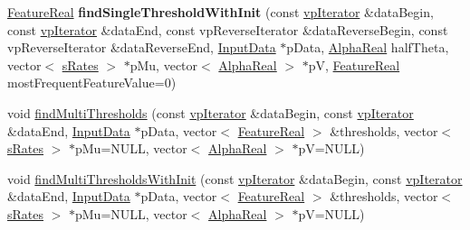 \begin{DoxyCompactItemize}
\hypertarget{classMultiBoost_1_1StumpAlgorithm_ad5da4a93172868d85c28dae3004019a2}{\hyperlink{Defaults_8h_a3a11cfe6a5d469d921716ca6291e934f}{Feature\-Real} {\bfseries find\-Single\-Threshold\-With\-Init} (const \hyperlink{classMultiBoost_1_1StumpAlgorithm_a358eae7c8636c09b6b26ef0cc74bbd51}{vp\-Iterator} \&data\-Begin, const \hyperlink{classMultiBoost_1_1StumpAlgorithm_a358eae7c8636c09b6b26ef0cc74bbd51}{vp\-Iterator} \&data\-End, const vp\-Reverse\-Iterator \&data\-Reverse\-Begin, const vp\-Reverse\-Iterator \&data\-Reverse\-End, \hyperlink{classMultiBoost_1_1InputData}{Input\-Data} $\ast$p\-Data, \hyperlink{Defaults_8h_a80184c4fd10ab70a1a17c5f97dcd1563}{Alpha\-Real} half\-Theta, vector$<$ \hyperlink{structMultiBoost_1_1sRates}{s\-Rates} $>$ $\ast$p\-Mu, vector$<$ \hyperlink{Defaults_8h_a80184c4fd10ab70a1a17c5f97dcd1563}{Alpha\-Real} $>$ $\ast$p\-V, \hyperlink{Defaults_8h_a3a11cfe6a5d469d921716ca6291e934f}{Feature\-Real} most\-Frequent\-Feature\-Value=0)}\label{classMultiBoost_1_1StumpAlgorithm_ad5da4a93172868d85c28dae3004019a2}

\item 
void \hyperlink{classMultiBoost_1_1StumpAlgorithm_ab50c25e9822b7b09ad5c01028ae624b9}{find\-Multi\-Thresholds} (const \hyperlink{classMultiBoost_1_1StumpAlgorithm_a358eae7c8636c09b6b26ef0cc74bbd51}{vp\-Iterator} \&data\-Begin, const \hyperlink{classMultiBoost_1_1StumpAlgorithm_a358eae7c8636c09b6b26ef0cc74bbd51}{vp\-Iterator} \&data\-End, \hyperlink{classMultiBoost_1_1InputData}{Input\-Data} $\ast$p\-Data, vector$<$ \hyperlink{Defaults_8h_a3a11cfe6a5d469d921716ca6291e934f}{Feature\-Real} $>$ \&thresholds, vector$<$ \hyperlink{structMultiBoost_1_1sRates}{s\-Rates} $>$ $\ast$p\-Mu=N\-U\-L\-L, vector$<$ \hyperlink{Defaults_8h_a80184c4fd10ab70a1a17c5f97dcd1563}{Alpha\-Real} $>$ $\ast$p\-V=N\-U\-L\-L)
\item 
void \hyperlink{classMultiBoost_1_1StumpAlgorithm_ad967b2d0083e2ca6c793c7d8557f2f49}{find\-Multi\-Thresholds\-With\-Init} (const \hyperlink{classMultiBoost_1_1StumpAlgorithm_a358eae7c8636c09b6b26ef0cc74bbd51}{vp\-Iterator} \&data\-Begin, const \hyperlink{classMultiBoost_1_1StumpAlgorithm_a358eae7c8636c09b6b26ef0cc74bbd51}{vp\-Iterator} \&data\-End, \hyperlink{classMultiBoost_1_1InputData}{Input\-Data} $\ast$p\-Data, vector$<$ \hyperlink{Defaults_8h_a3a11cfe6a5d469d921716ca6291e934f}{Feature\-Real} $>$ \&thresholds, vector$<$ \hyperlink{structMultiBoost_1_1sRates}{s\-Rates} $>$ $\ast$p\-Mu=N\-U\-L\-L, vector$<$ \hyperlink{Defaults_8h_a80184c4fd10ab70a1a17c5f97dcd1563}{Alpha\-Real} $>$ $\ast$p\-V=N\-U\-L\-L)
\end{DoxyCompactItemize}
